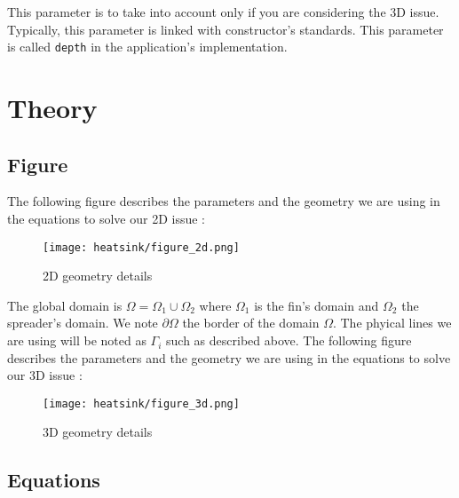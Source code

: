 This parameter is to take into account only if you are considering the 3D issue. Typically, this parameter is linked with constructor's standards. This parameter is called \lstinline!depth! in the application's implementation.


\section{Theory}
\label{therm:equations}

\subsection{Figure}
The following figure describes the parameters and the geometry we are using in the equations to solve our 2D issue :
\begin{figure}[!h]
\centering
\texttt{[image: heatsink/figure\_2d.png]}
\caption{2D geometry details}
\end{figure}

The global domain is $\varOmega = \varOmega_1 \cup \varOmega_2 $ where $\varOmega_1$ is the fin's domain and $\varOmega_2$ the spreader's domain. We note $\partial\varOmega$ the border of the domain $\varOmega$. The phyical lines we are using will be noted as $\Gamma_i$ such as described above. The following figure describes the parameters and the geometry we are using in the equations to solve our 3D issue :
\begin{figure}[!h]
\centering
\texttt{[image: heatsink/figure\_3d.png]}
\caption{3D geometry details}
\end{figure}

\subsection{Equations}

